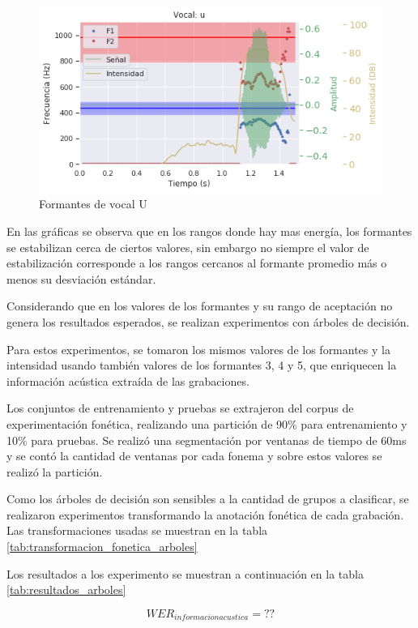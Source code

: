 \begin{figure}[H]
\caption{Formantes de vocal U}
\label{img:formantes_u}
\includegraphics[width=\textwidth]{imagenes/04_02_u.png}
\end{figure}


En las gráficas se observa que en los rangos donde hay mas energía, los formantes se estabilizan cerca de ciertos valores, sin embargo no siempre el valor de estabilización corresponde a los rangos cercanos al formante promedio más o menos su desviación estándar.

Considerando que en los valores de los formantes y su rango de aceptación no genera los resultados esperados, se realizan experimentos con árboles de decisión.

Para estos experimentos, se tomaron los mismos valores de los formantes y la intensidad usando también valores de los formantes 3, 4 y 5, que enriquecen la información acústica extraída de las grabaciones.

Los conjuntos de entrenamiento y pruebas se extrajeron del corpus de experimentación fonética, realizando una partición de 90\% para entrenamiento y 10\% para pruebas. Se realizó una segmentación por ventanas de tiempo de 60ms y se contó la cantidad de ventanas por cada fonema y sobre estos valores se realizó la partición.

Como los árboles de decisión son sensibles a la cantidad de grupos a clasificar, se realizaron experimentos transformando la anotación fonética de cada grabación. Las transformaciones usadas se muestran en la tabla \ref{tab:transformacion_fonetica_arboles}



Los resultados a los experimento se muestran a continuación en la tabla \ref{tab:resultados_arboles}




\begin{equation}
    WER_{informacion acustica} = ??
\end{equation}